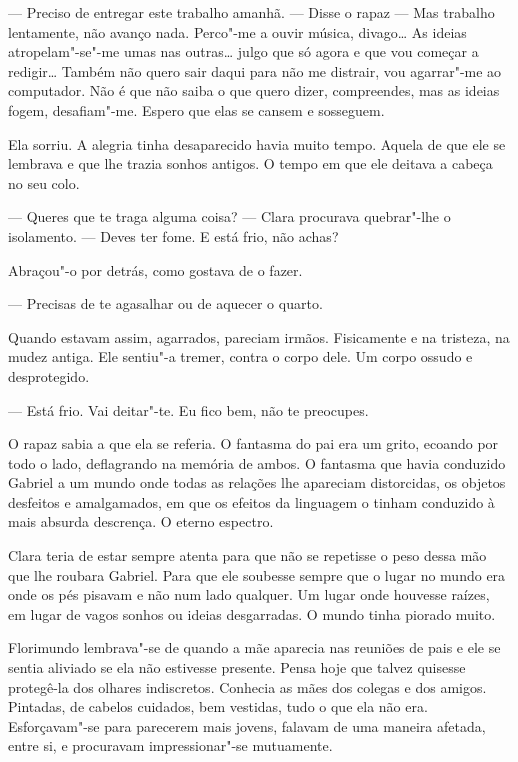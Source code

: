--- Preciso de entregar este trabalho amanhã. ---  Disse o rapaz --- Mas
trabalho lentamente, não avanço nada. Perco"-me a ouvir música, divago\ldots{}
As ideias atropelam"-se"-me umas nas outras\ldots{} julgo que só agora e que
vou começar a redigir\ldots{} Também não quero sair daqui para não me
distrair, vou agarrar"-me ao computador. Não é que não saiba o que quero
dizer, compreendes, mas as ideias fogem, desafiam"-me. Espero que elas se
cansem e sosseguem.

Ela sorriu. A alegria tinha desaparecido havia muito tempo. Aquela de
que ele se lembrava e que lhe trazia sonhos antigos. O tempo em que ele
deitava a cabeça no seu colo.

--- Queres que te traga alguma coisa? --- Clara procurava quebrar"-lhe o
isolamento. --- Deves ter fome. E está frio, não achas?

Abraçou"-o por detrás, como gostava de o fazer.

---  Precisas de te agasalhar ou de aquecer o quarto.

Quando estavam assim, agarrados, pareciam irmãos. Fisicamente e na
tristeza, na mudez antiga. Ele sentiu"-a tremer, contra o corpo dele. Um
corpo ossudo e desprotegido.

--- Está frio. Vai deitar"-te. Eu fico bem, não te preocupes.

O rapaz sabia a que ela se referia. O fantasma do pai era um grito,
ecoando por todo o lado, deflagrando na memória de ambos. O fantasma que
havia conduzido Gabriel a um mundo onde todas as relações lhe apareciam
distorcidas, os objetos desfeitos e amalgamados, em que os efeitos da
linguagem o tinham conduzido à mais absurda descrença. O eterno
espectro.

Clara teria de estar sempre atenta para que não se repetisse o peso
dessa mão que lhe roubara Gabriel. Para que ele soubesse sempre que o
lugar no mundo era onde os pés pisavam e não num lado qualquer. Um lugar
onde houvesse raízes, em lugar de vagos sonhos ou ideias desgarradas. O
mundo tinha piorado muito.

Florimundo lembrava"-se de quando a mãe aparecia nas reuniões de pais e
ele se sentia aliviado se ela não estivesse presente. Pensa hoje que
talvez quisesse protegê-la dos olhares indiscretos. Conhecia as mães dos
colegas e dos amigos. Pintadas, de cabelos cuidados, bem vestidas, tudo
o que ela não era. Esforçavam"-se para parecerem mais jovens, falavam de
uma maneira afetada, entre si, e procuravam impressionar"-se mutuamente.

